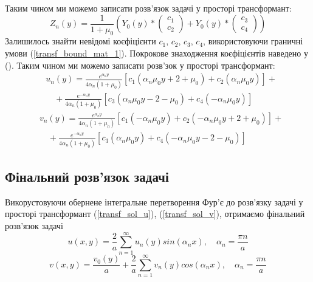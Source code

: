 \documentclass[a4paper,14pt]{extarticle}
\numberwithin{equation}{section}
\begin{document}
Таким чином ми можемо записати розв'язок задачі у просторі трансформант:
\begin{equation}
    Z_n(y) = \frac{1}{1 + \mu_0} \left( Y_0(y) * \begin{pmatrix} c_1 \\ c_2 \end{pmatrix} +  Y_0(y) * \begin{pmatrix} c_3 \\ c_4 \end{pmatrix}  \right)
\end{equation}
Залишилось знайти невідомі коєфіцієнти $c_1$, $c_2$, $c_3$, $c_4$, використовуючи граничні умови (\ref{transf_bound_mat_1}).
Покрокове знаходження коєфіцієнтів наведено у ().
Таким чином ми можемо записати розв'зок у просторі трансформант:
\begin{align}\label{transf_sol_u}
    &u_n(y) = \frac{e^{\alpha_n y}}{4 \alpha_n (1 + \mu_0)} \left[c_1 (\alpha_n \mu_0 y + 2 + \mu_0) + c_2 (\alpha_n \mu_0 y) \right] + \nonumber \\
    &\quad + \frac{e^{-\alpha_n y}}{4 \alpha_n (1 + \mu_0)} \left[c_3 (\alpha_n \mu_0 y - 2 - \mu_0) + c_4 (-\alpha_n \mu_0 y)\right]
\end{align}
\begin{align}\label{transf_sol_v}
    &v_n(y) = \frac{e^{\alpha_n y}}{4 \alpha_n (1 + \mu_0)} \left[c_1 (-\alpha_n \mu_0 y) + c_2 (-\alpha_n \mu_0 y + 2 + \mu_0) \right] + \nonumber \\
    &\quad + \frac{e^{-\alpha_n y}}{4 \alpha_n (1 + \mu_0)} \left[c_3 (\alpha_n \mu_0 y) + c_4 (-\alpha_n \mu_0 y - 2 - \mu_0)\right]
\end{align}

\subsection{Фінальний розв'язок задачі}
Викорустовуючи обернене інтегральне перетворення Фур'є до розв'язку задачі у просторі трансформант
(\ref{transf_sol_u}), (\ref{transf_sol_v}), отримаємо фінальний розв'язок задачі
\begin{equation}
    u(x,y) = \frac{2}{a} \sum_{n=1}^{\infty} u_n(y) sin(\alpha_n x), \quad \alpha_n = \frac{\pi n}{a}
\end{equation}
\begin{equation}
    v(x,y) = \frac{v_0(y)}{a} + \frac{2}{a} \sum_{n=1}^{\infty} v_n(y) cos(\alpha_n x), \quad \alpha_n = \frac{\pi n}{a}
\end{equation}
\end{document}
